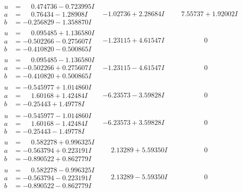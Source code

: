 \documentclass[1p]{elsarticle_modified}
\theoremstyle{definition}
\begin{document}
$$\begin{array}{c|c|c}
\begin{aligned}
u &= \phantom{-}0.474736 - 0.723995 I \\
a &= \phantom{-}0.76434 - 1.28908 I \\
b &= -0.256829 - 1.358870 I\end{aligned}
 & -1.02736 + 2.28684 I & \phantom{-}7.55737 + 1.92002 I \\ \hline\begin{aligned}
u &= \phantom{-}0.095485 + 1.136580 I \\
a &= -0.502266 - 0.275607 I \\
b &= -0.410820 - 0.500865 I\end{aligned}
 & -1.23115 + 4.61547 I & \phantom{-0.000000 } 0 \\ \hline\begin{aligned}
u &= \phantom{-}0.095485 - 1.136580 I \\
a &= -0.502266 + 0.275607 I \\
b &= -0.410820 + 0.500865 I\end{aligned}
 & -1.23115 - 4.61547 I & \phantom{-0.000000 } 0 \\ \hline\begin{aligned}
u &= -0.545977 + 1.014860 I \\
a &= \phantom{-}1.60168 + 1.42484 I \\
b &= -0.25443 + 1.49778 I\end{aligned}
 & -6.23573 - 3.59828 I & \phantom{-0.000000 } 0 \\ \hline\begin{aligned}
u &= -0.545977 - 1.014860 I \\
a &= \phantom{-}1.60168 - 1.42484 I \\
b &= -0.25443 - 1.49778 I\end{aligned}
 & -6.23573 + 3.59828 I & \phantom{-0.000000 } 0 \\ \hline\begin{aligned}
u &= \phantom{-}0.582278 + 0.996325 I \\
a &= -0.563794 + 0.223191 I \\
b &= -0.890522 + 0.862779 I\end{aligned}
 & \phantom{-}2.13289 + 5.59350 I & \phantom{-0.000000 } 0 \\ \hline\begin{aligned}
u &= \phantom{-}0.582278 - 0.996325 I \\
a &= -0.563794 - 0.223191 I \\
b &= -0.890522 - 0.862779 I\end{aligned}
 & \phantom{-}2.13289 - 5.59350 I & \phantom{-0.000000 } 0 \\ \hline\begin{aligned}

\end{aligned}
\end{array}$$
\end{document}
